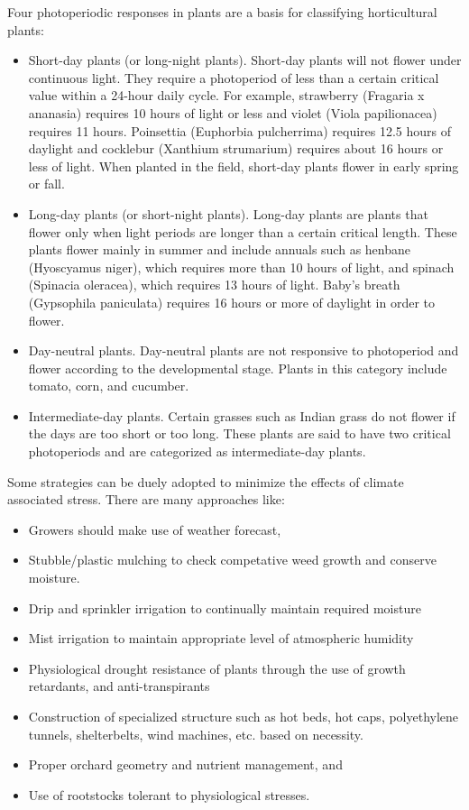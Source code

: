 \documentclass[
]{book}
\providecommand{\tightlist}{%
  \setlength{\itemsep}{0pt}\setlength{\parskip}{0pt}}
\begin{document}
Four photoperiodic responses in plants are a basis for classifying horticultural plants:

\begin{itemize}
\item
  Short-day plants (or long-night plants). Short-day plants will not flower under continuous light. They require a photoperiod of less than a certain critical value within a 24-hour daily cycle. For example, strawberry (Fragaria x ananasia) requires 10 hours of light or less and violet (Viola papilionacea) requires 11 hours. Poinsettia (Euphorbia pulcherrima) requires 12.5 hours of daylight and cocklebur (Xanthium strumarium) requires about 16 hours or less of light. When planted in the field, short-day plants flower in early spring or fall.
\item
  Long-day plants (or short-night plants). Long-day plants are plants that flower only when light periods are longer than a certain critical length. These plants flower mainly in summer and include annuals such as henbane (Hyoscyamus niger), which requires more than 10 hours of light, and spinach (Spinacia oleracea), which requires 13 hours of light. Baby's breath (Gypsophila paniculata) requires 16 hours or more of daylight in order to flower.
\item
  Day-neutral plants. Day-neutral plants are not responsive to photoperiod and flower according to the developmental stage. Plants in this category include tomato, corn, and cucumber.
\item
  Intermediate-day plants. Certain grasses such as Indian grass do not flower if the days are too short or too long. These plants are said to have two critical photoperiods and are categorized as intermediate-day plants.
\end{itemize}

Some strategies can be duely adopted to minimize the effects of climate associated stress. There are many approaches like:

\begin{itemize}
\tightlist
\item
  Growers should make use of weather forecast,
\item
  Stubble/plastic mulching to check competative weed growth and conserve moisture.
\item
  Drip and sprinkler irrigation to continually maintain required moisture
\item
  Mist irrigation to maintain appropriate level of atmospheric humidity
\item
  Physiological drought resistance of plants through the use of growth retardants, and anti-transpirants
\item
  Construction of specialized structure such as hot beds, hot caps, polyethylene tunnels, shelterbelts, wind machines, etc. based on necessity.
\item
  Proper orchard geometry and nutrient management, and
\item
  Use of rootstocks tolerant to physiological stresses.
\end{itemize}
\end{document}
